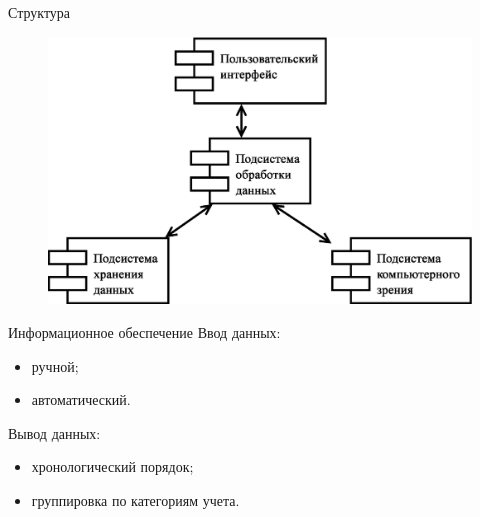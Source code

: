 \documentclass[hyperref={pdftex,unicode}]{beamer}
\begin{document}
\begin{frame}{Структура}
  \begin{figure}[h!]
    \centering
    \includegraphics[width=\textwidth]{fig/design_main.eps}
  \end{figure}
\end{frame}

\begin{frame}{Информационное обеспечение}
  Ввод данных:
  \begin{itemize}
    \item ручной;
    \item автоматический.
  \end{itemize}

  \smallskip
  Вывод данных:
  \begin{itemize}
    \item хронологический порядок;
    \item группировка по категориям учета.
  \end{itemize}
\end{frame}
\end{document}
